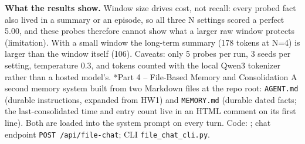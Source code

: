 \documentclass[11pt]{article}
\makeatletter
\renewcommand\section{\@startsection{section}{1}{\z@}{-3.0ex \@plus -1ex \@minus -.2ex}{1.2ex \@plus.2ex}{\normalfont\fontsize{14}{17}\selectfont\bfseries}}
\makeatother
\begin{document}
\textbf{What the results show.} Window size drives cost, not recall: every probed fact also lived in a summary or an episode, so all three N settings scored a perfect 5.00, and these probes therefore cannot show what a larger raw window protects (limitation). With a small window the long-term summary (178 tokens at N=4) is larger than the window itself (106). Caveats: only 5 probes per run, 3 seeds per setting, temperature 0.3, and tokens counted with the local Qwen3 tokenizer rather than a hosted model's.
\section*{Part 4 -- File-Based Memory and Consolidation}
A second memory system built from two Markdown files at the repo root: \verb|AGENT.md| (durable instructions, expanded from HW1) and \verb|MEMORY.md| (durable dated facts; the last-consolidated time and entry count live in an HTML comment on its first line). Both are loaded into the system prompt on every turn. Code: ; chat endpoint \verb|POST /api/file-chat|; CLI \verb|file_chat_cli.py|.
\end{document}
